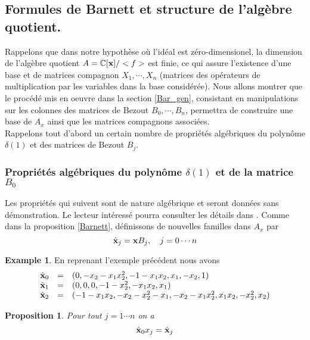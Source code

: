 \documentclass{article}
\theoremstyle{plain}%
\newtheorem{prop}{Proposition}
\theoremstyle{definition}
\newtheorem{exmp}{Example}
\theoremstyle{remark}
\newcommand{\C}{\mathbb{C}}
\begin{document}
\subsection{Formules de Barnett et structure de l'algèbre quotient.}

Rappelons que dans notre hypothèse où l'idéal est zéro-dimensionel, la dimension de l'algèbre quotient $A = \C[\bold{x}]/<f>$ est finie, ce qui assure l'existence d'une base et de matrices compagnon $X_1,\cdots, X_n$ (matrices des opérateurs de multiplication par les variables dans la base considérée). Nous allons montrer que le procédé mis en oeuvre dans la section \ref{Bar_gen}, consistant en manipulations sur les colonnes des matrices de Bezout $B_0, \cdots, B_n $, permettra de construire une base de $A_x$ ainsi que les matrices compagnons associées.\\
Rappelons tout d'abord un certain nombre de propriétés algébriques du polynôme $\delta(1)$ et des matrices de Bezout $B_j$.

\subsubsection{Propriétés algébriques du polynôme $\delta(1)$ et de la matrice $B_0$}
Les propriétés qui suivent sont de nature algébrique et seront données sans démonstration. Le lecteur intéressé pourra consulter les détails dans \cite{jpc, CM}. Comme dans la proposition \ref{Barnett}, définissons de nouvelles familles dans $A_x$ par
\begin{equation}
		\hat{\bold{x}}_j  =  \bold{x}B_j, \quad j=0\cdots n
\end{equation}

\begin{exmp}
En reprenant l'exemple précédent nous avons
\begin{equation}
	\begin{array}{lll}
		\hat{\bold{x}}_0 & = & (0, -x_2 - x_1x_2^2, -1 - x_1x_2, x_1, -x_2, 1) \\
		\hat{\bold{x}}_1 & = & (0, 0, 0, -1 - x_2^2, -x_1x_2, x_1) \\
		\hat{\bold{x}}_2 & = & (-1 - x_1x_2, -x_2 - x_2^2 - x_1, - x_2 - x_1x_2^2, x_1x_2, -x_2^2, x_2)
	\end{array}
\end{equation}
\end{exmp}

\begin{prop}
\label{xj}
Pour tout $j=1\cdots n$ on a
\begin{equation}
    \hat{\bold{x}}_0x_j = \hat{\bold{x}}_j
\end{equation}
\end{prop}
\end{document}
